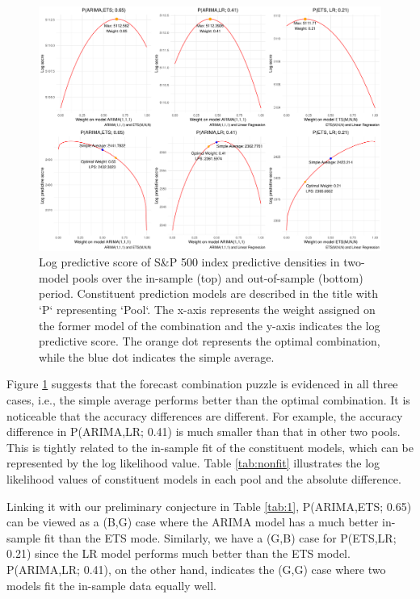 \documentclass{monashthesis}
\begin{document}
\begin{figure}[ht]
\centering
\includegraphics[scale=0.45]{figures/SP500_nonstationary.pdf}
\caption{Log predictive score of S\&P 500 index predictive densities in two-model pools over the in-sample (top) and out-of-sample (bottom) period. Constituent prediction models are described in the title with `P` representing `Pool`. The x-axis represents the weight assigned on the former model of the combination and the y-axis indicates the log predictive score. The orange dot represents the optimal combination, while the blue dot indicates the simple average.}
\label{fig:nonstat}
\end{figure}

Figure \ref{fig:nonstat} suggests that the forecast combination puzzle is evidenced in all three cases, i.e., the simple average performs better than the optimal combination. It is noticeable that the accuracy differences are different. For example, the accuracy difference in P(ARIMA,LR; 0.41) is much smaller than that in other two pools. This is tightly related to the in-sample fit of the constituent models, which can be represented by the log likelihood value. Table \ref{tab:nonfit} illustrates the log likelihood values of constituent models in each pool and the absolute difference.

Linking it with our preliminary conjecture in Table \ref{tab:1}, P(ARIMA,ETS; 0.65) can be viewed as a (B,G) case where the ARIMA model has a much better in-sample fit than the ETS mode. Similarly, we have a (G,B) case for P(ETS,LR; 0.21) since the LR model performs much better than the ETS model. P(ARIMA,LR; 0.41), on the other hand, indicates the (G,G) case where two models fit the in-sample data equally well.
\end{document}
